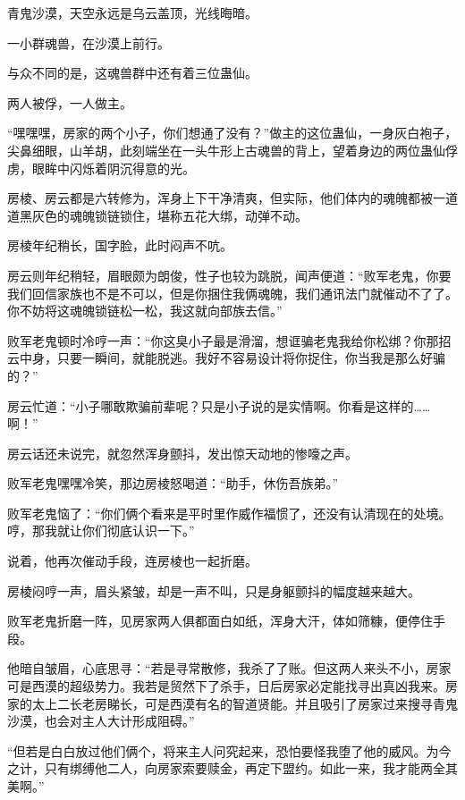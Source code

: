 
\begin{this_body}

青鬼沙漠，天空永远是乌云盖顶，光线晦暗。

一小群魂兽，在沙漠上前行。

与众不同的是，这魂兽群中还有着三位蛊仙。

两人被俘，一人做主。

“嘿嘿嘿，房家的两个小子，你们想通了没有？”做主的这位蛊仙，一身灰白袍子，尖鼻细眼，山羊胡，此刻端坐在一头牛形上古魂兽的背上，望着身边的两位蛊仙俘虏，眼眸中闪烁着阴沉得意的光。

房棱、房云都是六转修为，浑身上下干净清爽，但实际，他们体内的魂魄都被一道道黑灰色的魂魄锁链锁住，堪称五花大绑，动弹不动。

房棱年纪稍长，国字脸，此时闷声不吭。

房云则年纪稍轻，眉眼颇为朗俊，性子也较为跳脱，闻声便道：“败军老鬼，你要我们回信家族也不是不可以，但是你捆住我俩魂魄，我们通讯法门就催动不了了。你不妨将这魂魄锁链松一松，我这就向部族去信。”

败军老鬼顿时冷哼一声：“你这臭小子最是滑溜，想诓骗老鬼我给你松绑？你那招云中身，只要一瞬间，就能脱逃。我好不容易设计将你捉住，你当我是那么好骗的？”

房云忙道：“小子哪敢欺骗前辈呢？只是小子说的是实情啊。你看是这样的……啊！”

房云话还未说完，就忽然浑身颤抖，发出惊天动地的惨嚎之声。

败军老鬼嘿嘿冷笑，那边房棱怒喝道：“助手，休伤吾族弟。”

败军老鬼恼了：“你们俩个看来是平时里作威作福惯了，还没有认清现在的处境。哼，那我就让你们彻底认识一下。”

说着，他再次催动手段，连房棱也一起折磨。

房棱闷哼一声，眉头紧皱，却是一声不叫，只是身躯颤抖的幅度越来越大。

败军老鬼折磨一阵，见房家两人俱都面白如纸，浑身大汗，体如筛糠，便停住手段。

他暗自皱眉，心底思寻：“若是寻常散修，我杀了了账。但这两人来头不小，房家可是西漠的超级势力。我若是贸然下了杀手，日后房家必定能找寻出真凶我来。房家的太上二长老房睇长，可是西漠有名的智道贤能。并且吸引了房家过来搜寻青鬼沙漠，也会对主人大计形成阻碍。”

“但若是白白放过他们俩个，将来主人问究起来，恐怕要怪我堕了他的威风。为今之计，只有绑缚他二人，向房家索要赎金，再定下盟约。如此一来，我才能两全其美啊。”


\end{this_body}
